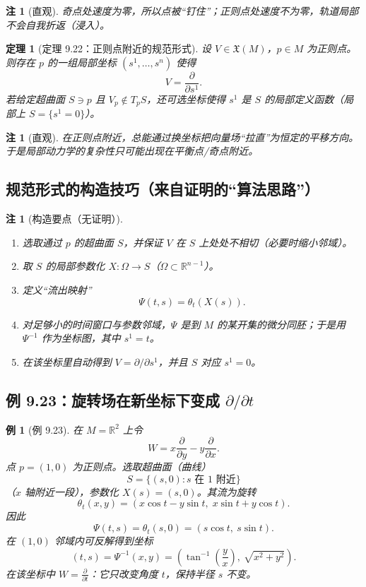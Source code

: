 \documentclass[11pt]{article}
\newtheorem{theorem}[definition]{定理}
\newtheorem{example}[definition]{例}
\newtheorem{remark}[definition]{注}
\newcommand{\R}{\mathbb{R}}
\newcommand{\X}{\mathfrak{X}}
\begin{document}
\begin{remark}[直观]
奇点处速度为零，所以点被“钉住”；正则点处速度不为零，轨道局部不会自我折返（浸入）。
\end{remark}

\begin{theorem}[定理 9.22：正则点附近的规范形式]
设 $V\in\X(M)$，$p\in M$ 为正则点。则存在 $p$ 的一组局部坐标 $(s^1,\dots,s^n)$ 使得
\[
V=\frac{\partial}{\partial s^1}.
\]
若给定超曲面 $S\ni p$ 且 $V_p\notin T_pS$，还可选坐标使得 $s^1$ 是 $S$ 的局部定义函数（局部上 $S=\{s^1=0\}$）。
\end{theorem}

\begin{remark}[直观]
在正则点附近，总能通过换坐标把向量场“拉直”为恒定的平移方向。于是局部动力学的复杂性只可能出现在平衡点/奇点附近。
\end{remark}

\subsection{规范形式的构造技巧（来自证明的“算法思路”）}

\begin{remark}[构造要点（无证明）]
\begin{enumerate}[label=\textbf{Step \arabic*:},leftmargin=2.5em]
\item 选取通过 $p$ 的超曲面 $S$，并保证 $V$ 在 $S$ 上处处不相切（必要时缩小邻域）。
\item 取 $S$ 的局部参数化 $X:\Omega\to S$（$\Omega\subset\R^{n-1}$）。
\item 定义“流出映射”
\[
\Psi(t,s)=\theta_t(X(s)).
\]
\item 对足够小的时间窗口与参数邻域，$\Psi$ 是到 $M$ 的某开集的微分同胚；于是用 $\Psi^{-1}$ 作为坐标图，其中 $s^1=t$。
\item 在该坐标里自动得到 $V=\partial/\partial s^1$，并且 $S$ 对应 $s^1=0$。
\end{enumerate}
\end{remark}

\subsection{例 9.23：旋转场在新坐标下变成 $\partial/\partial t$}

\begin{example}[例 9.23]
在 $M=\R^2$ 上令
\[
W=x\frac{\partial}{\partial y}-y\frac{\partial}{\partial x}.
\]
点 $p=(1,0)$ 为正则点。选取超曲面（曲线）
\[
S=\{(s,0): s \text{ 在 }1\text{ 附近}\}
\]
（$x$ 轴附近一段），参数化 $X(s)=(s,0)$。其流为旋转
\[
\theta_t(x,y)=(x\cos t-y\sin t,\;x\sin t+y\cos t).
\]
因此
\[
\Psi(t,s)=\theta_t(s,0)=(s\cos t,\ s\sin t).
\]
在 $(1,0)$ 邻域内可反解得到坐标
\[
(t,s)=\Psi^{-1}(x,y)=\left(\tan^{-1}\!\left(\frac{y}{x}\right),\ \sqrt{x^2+y^2}\right). \tag{9.13}
\]
在该坐标中 $W=\frac{\partial}{\partial t}$：它只改变角度 $t$，保持半径 $s$ 不变。
\end{example}
\end{document}
